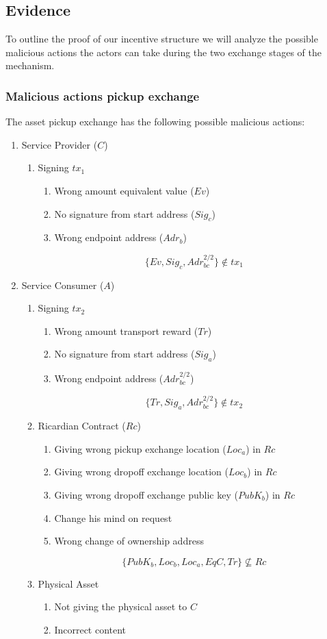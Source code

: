 \subsection{Evidence}

To outline the proof of our incentive structure we will analyze the possible malicious actions the actors can take during the two exchange stages of the mechanism.

\subsubsection{Malicious actions pickup exchange}

The asset pickup exchange has the following possible malicious actions:
\begin{enumerate}
  \item Service Provider ($C$)
  \begin{enumerate}
    \item Signing $tx_1$
    \begin{enumerate}
      \item Wrong amount equivalent value ($Ev$)
      \item No signature from start address ($Sig_c$)
      \item Wrong endpoint address ($Adr_b$)
    \end{enumerate}
    \[\{Ev, Sig_c, Adr_{bc}^{2/2}\}\not\in tx_1\]
  \end{enumerate}
  \item Service Consumer ($A$)
  \begin{enumerate}
    \item Signing $tx_2$
    \begin{enumerate}
      \item Wrong amount transport reward ($Tr$)
      \item No signature from start address ($Sig_a$)
      \item Wrong endpoint address ($Adr_{bc}^{2/2}$)
    \end{enumerate}
    \[\{Tr, Sig_a, Adr_{bc}^{2/2}\}\not\in tx_2\]
    \item Ricardian Contract ($Rc$)
    \begin{enumerate}
      \item Giving wrong pickup exchange location ($Loc_a$) in $Rc$
      \item Giving wrong dropoff exchange location ($Loc_b$) in $Rc$
      \item Giving wrong dropoff exchange public key ($PubK_b$) in $Rc$
      \item Change his mind on request
      \item Wrong change of ownership address
    \end{enumerate}
    \[\{PubK_b, Loc_b, Loc_a, EqC, Tr\} \not\subseteq Rc\]
    \item Physical Asset
    \begin{enumerate}
      \item Not giving the physical asset to $C$
      \item Incorrect content
    \end{enumerate}
  \end{enumerate}
\end{enumerate}

